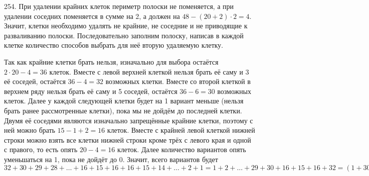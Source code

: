254. При удалении крайних клеток периметр полоски не поменяется, а при удалении соседних поменяется в сумме на 2, а должен на $48-(20+2)\cdot2=4.$ Значит, клетки необходимо удалять не крайние, не соседние и не приводящие к разваливанию полоски. Последовательно заполним полоску, написав в каждой клетке количество способов выбрать для неё вторую удаляемую клетку.
\begin{center}
\begin{figure}[ht!]
\end{figure}
\end{center}
Так как крайние клетки брать нельзя, изначально для выбора остаётся $2\cdot20-4=36$ клеток. Вместе с левой верхней клеткой нельзя брать её саму и 3 её соседей, остаётся $36-4=32$ возможных клетки. Вместе со второй клеткой в верхнем ряду нельзя брать её саму и 5 соседей, остаётся $36-6=30$ возможных клеток. Далее у каждой следующей клетки будет на 1 вариант меньше (нельзя брать ранее рассмотренные клетки), пока мы не дойдём до последней клетки. Двумя её соседями являются изначально запрещённые крайние клетки, поэтому с ней можно брать $15-1+2=16$ клеток. Вместе с крайней левой клеткой нижней строки можно взять все клетки нижней строки кроме трёх с левого края и одной с правого, то есть опять $20-4=16$ клеток. Далее количество вариантов опять уменьшаться на 1, пока не дойдёт до 0. Значит, всего вариантов будет $32+30+29+28+\ldots+16+15+16+16+15+14+\ldots+2+1=1+2+\ldots+29+30+16+15+16+32=(1+30)+(2+29)+\ldots+(15+16)+79=31\cdot15+79=544.$\newpage\noindent
